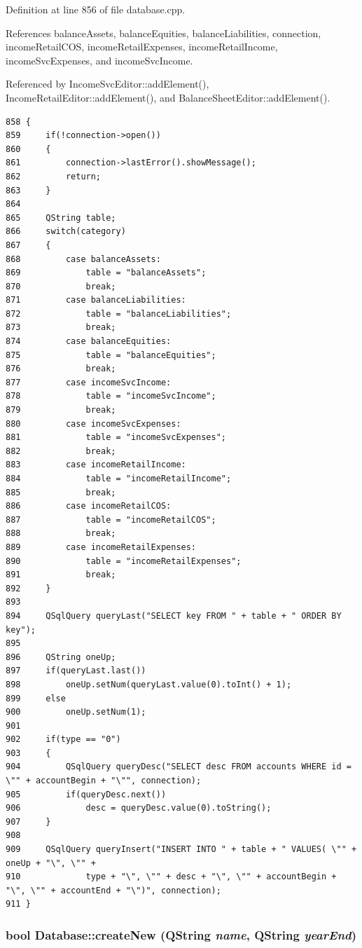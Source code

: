 Definition at line 856 of file database.cpp.

References balance\-Assets, balance\-Equities, balance\-Liabilities, connection, income\-Retail\-COS, income\-Retail\-Expenses, income\-Retail\-Income, income\-Svc\-Expenses, and income\-Svc\-Income.

Referenced by Income\-Svc\-Editor::add\-Element(), Income\-Retail\-Editor::add\-Element(), and Balance\-Sheet\-Editor::add\-Element().

\footnotesize\begin{verbatim}858 {
859     if(!connection->open())
860     {
861         connection->lastError().showMessage();
862         return;
863     }
864     
865     QString table;
866     switch(category)
867     {
868         case balanceAssets:
869             table = "balanceAssets";
870             break;
871         case balanceLiabilities:
872             table = "balanceLiabilities";
873             break;
874         case balanceEquities:
875             table = "balanceEquities";
876             break;
877         case incomeSvcIncome:
878             table = "incomeSvcIncome";
879             break;
880         case incomeSvcExpenses:
881             table = "incomeSvcExpenses";
882             break;
883         case incomeRetailIncome:
884             table = "incomeRetailIncome";
885             break;
886         case incomeRetailCOS:
887             table = "incomeRetailCOS";
888             break;
889         case incomeRetailExpenses:
890             table = "incomeRetailExpenses";
891             break;
892     }
893     
894     QSqlQuery queryLast("SELECT key FROM " + table + " ORDER BY key");
895     
896     QString oneUp;
897     if(queryLast.last())
898         oneUp.setNum(queryLast.value(0).toInt() + 1);
899     else
900         oneUp.setNum(1);
901     
902     if(type == "0")
903     {
904         QSqlQuery queryDesc("SELECT desc FROM accounts WHERE id = \"" + accountBegin + "\"", connection);
905         if(queryDesc.next())
906             desc = queryDesc.value(0).toString();
907     }
908     
909     QSqlQuery queryInsert("INSERT INTO " + table + " VALUES( \"" + oneUp + "\", \"" +
910             type + "\", \"" + desc + "\", \"" + accountBegin + "\", \"" + accountEnd + "\")", connection);
911 }
\end{verbatim}\normalsize 


\hypertarget{classDatabase_a2}{
\subsubsection[createNew]{\setlength{\rightskip}{0pt plus 5cm}bool Database::create\-New (QString {\em name}, QString {\em year\-End})}}
\label{classDatabase_a2}


